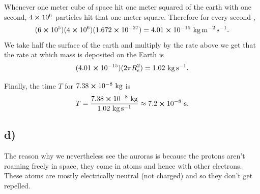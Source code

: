 \documentclass[
	12pt,
	]{article}
\theoremstyle{definition}
\theoremstyle{definition}
\theoremstyle{definition}
\theoremstyle{definition}
\theoremstyle{definition}
\theoremstyle{example}
\theoremstyle{note}
\theoremstyle{remark}
\theoremstyle{example}
\begin{document}
					\noindent Whenever one meter cube of space hit one meter squared of the earth with one second, $4\cross 10^{6}$ particles hit that one meter square. Therefore for every second ,
					$$ (6\cross 10^{5})(4\cross 10^{6})(1.672\cross 10^{-27}) = 4.01\cross 10^{-15} \ \si{\kilogram\per\meter\squared\per\second}.$$
					We take half the surface of the earth and multiply by the rate above we get that the rate at which mass is deposited on the Earth is 
					$$ (4.01\cross 10^{-15})(2\pi R_{e}^{2}) = 1.02 \ \si{\kilogram\per\second}.$$
					
					\noindent Finally, the time $T$ for $7.38 \cross 10^{-8} \ \si{\kilogram}$ is 
					$$ T = \frac{7.38 \cross 10^{-8} \ \si{\kilogram}}{1.02 \ \si{\kilogram\per\second}} \approx 7.2 \cross 10^{-8} \ \si{\second}.$$
					
				\subsection*{d) }
					The reason why we nevertheless see the auroras is because the protons aren't roaming freely in space, they come in atoms and hence with other electrons. These atoms are mostly electrically neutral (not charged) and so they don't get repelled. 
\end{document}
